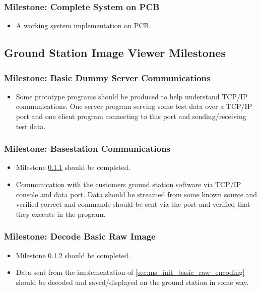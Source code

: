 	\subsubsection{Milestone: Complete System on PCB}
		\begin{itemize}
			\item A working system implementation on PCB.
		\end{itemize}


\subsection{Ground Station Image Viewer Milestones}
	\subsubsection{Milestone: Basic Dummy Server Communications}
		\label{sec:ms_init_basic_dummy_server_comms}
		\begin{itemize}
			\item 	Some prototype programs should be produced to help understand TCP/IP communications.
				One server program serving some test data over a TCP/IP port and one
				client program connecting to this port and sending/receiving test data.
		\end{itemize}

	\subsubsection{Milestone: Basestation Communications}
		\label{sec:ms_init_basestation_comms}
		\begin{itemize}
			\item 	Milestone \ref{sec:ms_init_basic_dummy_server_comms} should be
				completed.
			\item 	Communication with the customers ground station software via TCP/IP console and
				data port. Data should be streamed from some known source and verified correct and
				commands should be sent via the port and verified that they execute in the program.
		\end{itemize}

	\subsubsection{Milestone: Decode Basic Raw Image}
		\label{sec:ms_init_decode_basic_raw_image}
		\begin{itemize}
			\item 	Milestone \ref{sec:ms_init_basestation_comms} should be completed.
			\item 	Data sent from the implementation of \ref{sec:ms_init_basic_raw_encoding} should be
				decoded and saved/displayed on the ground station in some way.
		\end{itemize}

